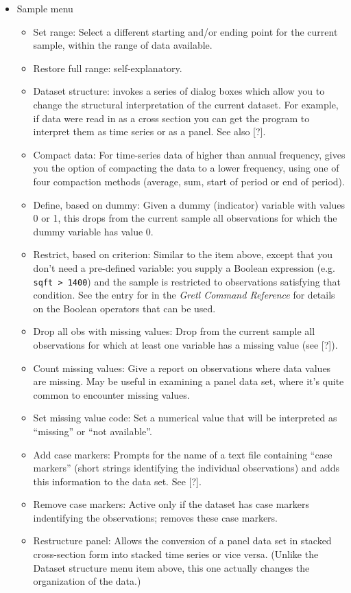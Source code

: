 \begin{itemize}
\item \textsf{Sample menu}
  \begin{itemize}
  \item \textsf{Set range}: Select a different starting and/or ending
    point for the current sample, within the range of data available.
  \item \textsf{Restore full range}: self-explanatory.
  \item \textsf{Dataset structure}: invokes a series of dialog boxes
    which allow you to change the structural interpretation of the
    current dataset.  For example, if data were read in as a cross
    section you can get the program to interpret them as time series
    or as a panel.  See also [?].
  \item \textsf{Compact data}: For time-series data of higher than
    annual frequency, gives you the option of compacting the data to a
    lower frequency, using one of four compaction methods (average,
    sum, start of period or end of period).
  \item \textsf{Define, based on dummy}: Given a dummy (indicator)
    variable with values 0 or 1, this drops from the current sample
    all observations for which the dummy variable has value 0.
  \item \textsf{Restrict, based on criterion}: Similar to the item
    above, except that you don't need a pre-defined variable: you
    supply a Boolean expression (e.g. \verb+sqft > 1400+) and the
    sample is restricted to observations satisfying that condition.
    See the entry for  in the \emph{Gretl Command Reference}
    for details on the Boolean operators that can be used.
  \item \textsf{Drop all obs with missing values}: Drop from the
    current sample all observations for which at least one variable
    has a missing value (see [?]).
	    
  \item \textsf{Count missing values}: Give a report on observations
    where data values are missing. May be useful in examining a panel
    data set, where it's quite common to encounter missing values.
  \item \textsf{Set missing value code}: Set a numerical value that
    will be interpreted as ``missing'' or ``not available''.
  \item \textsf{Add case markers}: Prompts for the name of a text file
    containing ``case markers'' (short strings identifying the
    individual observations) and adds this information to the data
    set. See [?].
  \item \textsf{Remove case markers}: Active only if the dataset has
    case markers indentifying the observations; removes these case
    markers.
  \item \textsf{Restructure panel}: Allows the conversion of a panel
    data set in stacked cross-section form into stacked time series or
    vice versa.  (Unlike the \textsf{Dataset structure} menu item
    above, this one actually changes the organization of the data.)
	    

\end{itemize}
\end{itemize}
